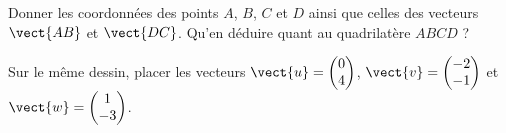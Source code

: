 
\begin{exercice}\label{exosmath-0590}


    Donner les coordonnées des points \( A\), \( B\), \( C\) et \( D\) ainsi que celles des vecteurs \( \vect{ AB }\) et \( \vect{ DC }\). Qu'en déduire quant au quadrilatère \( ABCD\) ?

    \begin{center}
   
    \end{center}

    Sur le même dessin, placer les vecteurs \( \vect{ u }=\begin{pmatrix}
        0    \\ 
        4    
    \end{pmatrix}\), \( \vect{ v }=\begin{pmatrix}
        -2    \\ 
        -1    
    \end{pmatrix}\) et \( \vect{ w }=\begin{pmatrix}
        1    \\ 
        -3    
    \end{pmatrix}\).

\end{exercice}
